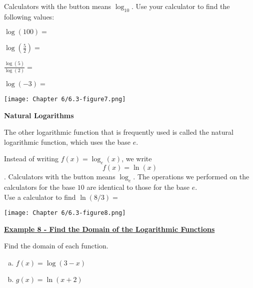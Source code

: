 \documentclass[12pt]{book}
\newcommand{\D}{\displaystyle}
\begin{document}
Calculators with the button \fbox{$\log$} means $\log_{10}$. Use your calculator to find the following values: 
\vspace{2mm}

$\D \log(100)=$
\vspace{15mm}

$\D \log\left(\frac{5}{2}\right)=$
\vspace{15mm}


$\D \frac{\log(5)}{\log(2)}=$
\vspace{15mm}


$\D \log(-3)=$

\vspace{40mm}
\centerline{\texttt{[image: Chapter 6/6.3-figure7.png]}}


\newpage


{\large \textbf{Natural Logarithms}}

The other logarithmic function that is frequently used is called the natural logarithmic function, which uses the base $e$. 

Instead of writing $f(x)=\log_e(x)$, we write $$f(x)=\ln(x)$$. 
Calculators with the button \fbox{$\ln$} means $\log_{e}$. The operations we performed on the calculators for the base $10$ are identical to those for the base $e$.
\\

Use a calculator to find $\ln(8/3)=$
\vspace{20mm}

\centerline{\texttt{[image: Chapter 6/6.3-figure8.png]}}
\vspace{5mm}

\underline{\textbf{Example 8 - Find the Domain of the Logarithmic Functions}}

Find the domain of each function.
\begin{enumerate}[(a)]
    \item $f(x)=\log(3-x)$
    \vspace{40mm}
    \item $g(x)=\ln(x+2)$
\end{enumerate}

\newpage
\end{document}
